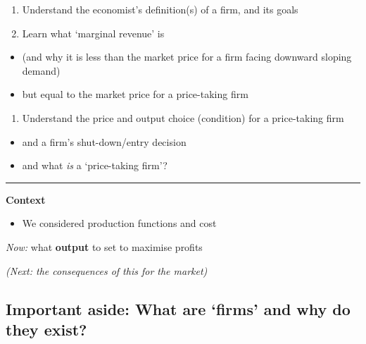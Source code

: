 \documentclass[]{article}
\providecommand{\tightlist}{%
  \setlength{\itemsep}{0pt}\setlength{\parskip}{0pt}}
\begin{document}
\begin{enumerate}
\def\labelenumi{\arabic{enumi}.}
\tightlist
\item
  Understand the economist's definition(s) of a firm, and its goals
\item
  Learn what `marginal revenue' is
\end{enumerate}

\begin{itemize}
\tightlist
\item
  (and why it is less than the market price for a firm facing downward
  sloping demand)
\item
  but equal to the market price for a price-taking firm
\end{itemize}

\begin{enumerate}
\def\labelenumi{\arabic{enumi}.}
\tightlist
\item
  Understand the price and output choice (condition) for a price-taking
  firm
\end{enumerate}

\begin{itemize}
\tightlist
\item
  and a firm's shut-down/entry decision
\item
  and what \emph{is} a `price-taking firm'?
\end{itemize}

\begin{center}\rule{0.5\linewidth}{\linethickness}\end{center}

\textbf{Context}

\begin{itemize}
\tightlist
\item
  We considered production functions and cost
\end{itemize}

\bigskip

\emph{Now:} what \textbf{output} to set to maximise profits

\bigskip

\emph{(Next: the consequences of this for the market)}

\hypertarget{important-aside-what-are-firms-and-why-do-they-exist}{%
\subsection{Important aside: What are `firms' and why do they
exist?}\label{important-aside-what-are-firms-and-why-do-they-exist}}
\end{document}
